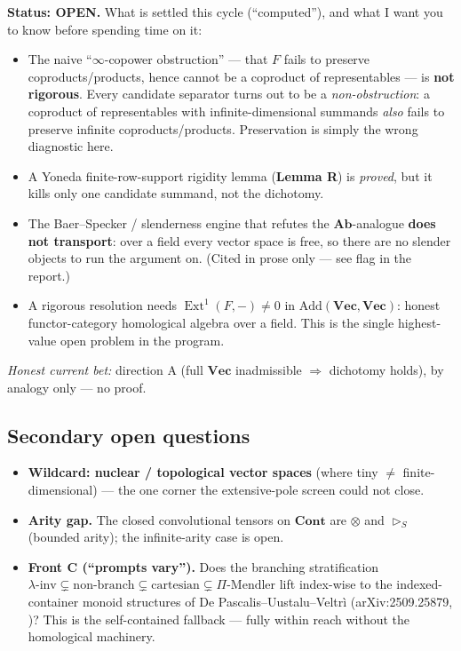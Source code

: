 \documentclass[11pt]{article}
\theoremstyle{plain}
\theoremstyle{definition}
\theoremstyle{remark}
\newcommand{\Vect}{\mathbf{Vec}}
\newcommand{\Cont}{\mathbf{Cont}}
\newcommand{\Add}{\mathrm{Add}}
\DeclareMathOperator{\Ext}{Ext}
\begin{document}
\noindent\textbf{Status: OPEN.} What is settled this cycle (``computed''), and what I want you to know
before spending time on it:
\begin{itemize}
\item The naive ``$\infty$-copower obstruction'' --- that $F$ fails to preserve coproducts/products,
hence cannot be a coproduct of representables --- is \textbf{not rigorous}. Every candidate separator
turns out to be a \emph{non-obstruction}: a coproduct of representables with infinite-dimensional
summands \emph{also} fails to preserve infinite coproducts/products. Preservation is simply the wrong
diagnostic here.
\item A Yoneda finite-row-support rigidity lemma (\textbf{Lemma R}) is \emph{proved}, but it kills only
one candidate summand, not the dichotomy.
\item The Baer--Specker / slenderness engine that refutes the $\mathbf{Ab}$-analogue \textbf{does not
transport}: over a field every vector space is free, so there are no slender objects to run the argument
on. (Cited in prose only --- see flag in the report.)
\item A rigorous resolution needs $\Ext^1(F,-)\neq 0$ in $\Add(\Vect,\Vect)$: honest
functor-category homological algebra over a field. This is the single highest-value open problem in the
program.
\end{itemize}
\emph{Honest current bet:} direction A (full $\Vect$ inadmissible $\Rightarrow$ dichotomy holds), by
analogy only --- no proof.

\subsection*{Secondary open questions}
\begin{itemize}
\item \textbf{Wildcard: nuclear / topological vector spaces} (where tiny $\neq$ finite-dimensional) ---
the one corner the extensive-pole screen could not close.
\item \textbf{Arity gap.} The closed convolutional tensors on $\Cont$ are $\otimes$ and $\triangleright_S$
(bounded arity); the infinite-arity case is open.
\item \textbf{Front C (``prompts vary'').} Does the branching stratification
$\lambda\text{-inv}\subsetneq\text{non-branch}\subsetneq\text{cartesian}\subsetneq\Pi\text{-Mendler}$
lift index-wise to the indexed-container monoid structures of De Pascalis--Uustalu--Veltr\`i
(arXiv:2509.25879, \cite{DPUV})? This is the self-contained fallback --- fully within reach without the
homological machinery.
\end{itemize}
\end{document}
